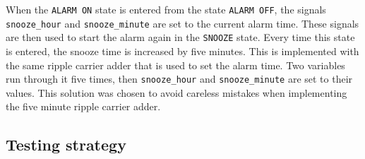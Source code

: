\documentclass[a4paper]{article}
\begin{document}
When the \texttt{ALARM ON} state is entered from the state \texttt{ALARM OFF}, 
the signals \texttt{snooze\_hour} and \texttt{snooze\_minute} are set to the current alarm time. 
These signals are then used to start the alarm again in the \texttt{SNOOZE} state. 
Every time this state is entered, the snooze time is increased by five minutes. 
This is implemented with the same ripple carrier adder that is used to set the alarm time.
Two variables run through it five times, then \texttt{snooze\_hour} and \texttt{snooze\_minute} 
are set to their values. 
This solution was chosen to avoid careless mistakes when implementing the five minute ripple carrier adder.

  \subsection{Testing strategy}
\end{document}
